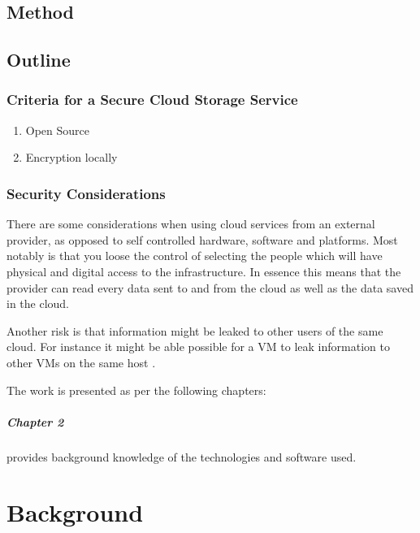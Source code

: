 \documentclass[pdftex,english,10pt,b5paper,twoside]{book}
\begin{document}
\section{Method}

\section{Outline}

\subsection{Criteria for a Secure Cloud Storage Service}
\label{sec:criteria}
\begin{enumerate}
  \item Open Source
  \item Encryption locally
\end{enumerate}

\subsection{Security Considerations}

There are some considerations when using
cloud services from an external provider, as opposed to self controlled
hardware, software and platforms. Most notably is that you loose the control of
selecting the people which will have physical and digital access to the
infrastructure. In essence this means that the provider can read every data
sent to and from the cloud as well as the data saved in the cloud.

Another risk is that information might be leaked to other users of the same
cloud. For instance it might be able possible for a \ac{VM} to leak information
to other \ac{VM}s on the same host \cite{cloud_getoff}.

The work is presented as per the following chapters:

\paragraph{Chapter 2} provides background knowledge of the technologies and
software used.


\chapter{Background}
\end{document}
